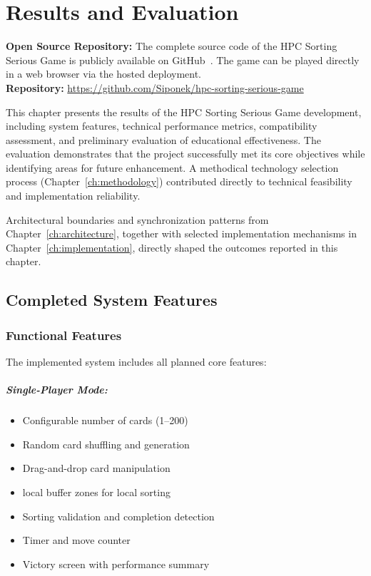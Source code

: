\chapter{Results and Evaluation}
\label{ch:results}

\begin{mdframed}[backgroundcolor=blue!5, linecolor=blue!60!black, linewidth=2pt]
    \textbf{Open Source Repository:} The complete source code of the HPC Sorting Serious Game is publicly available on GitHub~\citep{github_project}. The game can be played directly in a web browser via the hosted deployment.\\
    \textbf{Repository:} \url{https://github.com/Siponek/hpc-sorting-serious-game}
\end{mdframed}

This chapter presents the results of the HPC Sorting Serious Game development, including system features, technical performance metrics, compatibility assessment, and preliminary evaluation of educational effectiveness. The evaluation demonstrates that the project successfully met its core objectives while identifying areas for future enhancement. A methodical technology selection process (Chapter~\ref{ch:methodology}) contributed directly to technical feasibility and implementation reliability.

Architectural boundaries and synchronization patterns from Chapter~\ref{ch:architecture}, together with selected implementation mechanisms in Chapter~\ref{ch:implementation}, directly shaped the outcomes reported in this chapter.

\section{Completed System Features}
\label{sec:completed-features}

\subsection{Functional Features}
\label{subsec:functional-features}

The implemented system includes all planned core features:

\paragraph*{Single-Player Mode:}
\begin{itemize}
    \item Configurable number of cards (1--200)
    \item Random card shuffling and generation
    \item Drag-and-drop card manipulation
    \item local buffer zones for local sorting
    \item Sorting validation and completion detection
    \item Timer and move counter
    \item Victory screen with performance summary
\end{itemize}

